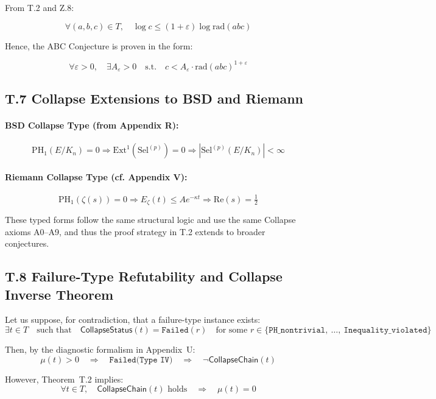 \documentclass[11pt]{article}
\begin{document}
From T.2 and Z.8:

\[
\forall (a,b,c) \in T,\quad
\log c \leq (1 + \varepsilon) \log \mathrm{rad}(abc)
\]

Hence, the ABC Conjecture is proven in the form:

\[
\forall \varepsilon > 0,\quad \exists A_\varepsilon > 0 \quad \text{s.t.}\quad
c < A_\varepsilon \cdot \mathrm{rad}(abc)^{1+\varepsilon}
\]

\subsection*{T.7 Collapse Extensions to BSD and Riemann}

\paragraph{BSD Collapse Type (from Appendix R):}
\[
\mathrm{PH}_1(E/K_n) = 0 \Rightarrow \mathrm{Ext}^1(\mathrm{Sel}^{(p)}) = 0 \Rightarrow \left| \mathrm{Sel}^{(p)}(E/K_n) \right| < \infty
\]

\paragraph{Riemann Collapse Type (cf. Appendix V):}
\[
\mathrm{PH}_1(\zeta(s)) = 0 \Rightarrow E_\zeta(t) \leq A e^{-\kappa t} \Rightarrow \mathrm{Re}(s) = \tfrac{1}{2}
\]

These typed forms follow the same structural logic and use the same Collapse axioms A0–A9,  
and thus the proof strategy in T.2 extends to broader conjectures.

\subsection*{T.8 Failure-Type Refutability and Collapse Inverse Theorem}

Let us suppose, for contradiction, that a failure-type instance exists:
\[
\exists t \in T \quad \text{such that} \quad \mathsf{CollapseStatus}(t) = \texttt{Failed}(r)
\quad \text{for some } r \in \{\texttt{PH\_nontrivial},\ \ldots,\ \texttt{Inequality\_violated} \}
\]

Then, by the diagnostic formalism in Appendix~U:
\[
\mu(t) > 0 \quad \Rightarrow \quad \texttt{Failed(Type~IV)} \quad \Rightarrow \quad \neg\mathsf{CollapseChain}(t)
\]

However, Theorem~T.2 implies:
\[
\forall t \in T, \quad \mathsf{CollapseChain}(t) \text{ holds} \quad \Rightarrow \quad \mu(t) = 0
\]
\end{document}

